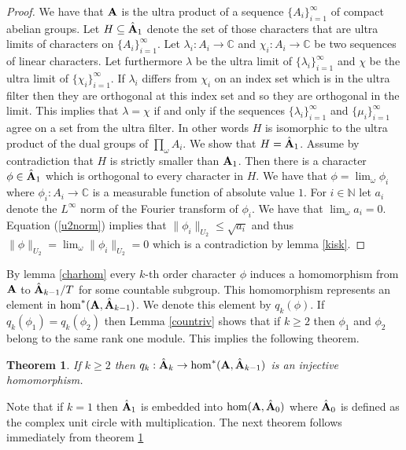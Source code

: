 \documentclass [11pt] {article}
\newtheorem{theorem}{Theorem}
\def\bA{{\bf A}}
\begin{document}
\begin{proof}
We have that $\bA$ is the ultra product of a sequence $\{A_i\}_{i=1}^\infty$ of compact abelian groups.
Let $H\subseteq\hat{\bA}_1$ denote the set of those characters that are ultra limits of characters on $\{A_i\}_{i=1}^\infty$.
Let $\lambda_i:A_i\rightarrow\mathbb{C}$ and $\chi_i:A_i\rightarrow\mathbb{C}$ be two sequences of linear characters. Let furthermore $\lambda$ be the ultra limit of $\{\lambda_i\}_{i=1}^\infty$ and $\chi$ be the ultra limit of $\{\chi_i\}_{i=1}^\infty$.
If $\lambda_i$ differs from $\chi_i$ on an index set which is in the ultra filter then they are orthogonal at this index set and so they are orthogonal in the limit. This implies that $\lambda=\chi$ if and only if the sequences $\{\lambda_i\}_{i=1}^\infty$ and $\{\mu_i\}_{i=1}^\infty$ agree on a set from the ultra filter. In other words $H$ is isomorphic to the ultra product of the dual groups of $\prod_\omega\hat{A_i}$. 
We show that $H=\hat{\bA}_1$. Assume by contradiction that $H$ is strictly smaller than $\bA_1$. Then there is a character $\phi\in\hat{\bA}_1$ which is orthogonal to every character in $H$.
We have that $\phi=\lim_\omega\phi_i$ where $\phi_i:A_i\rightarrow\mathbb{C}$ is a measurable function of absolute value $1$. For $i\in\mathbb{N}$ let $a_i$ denote the $L^\infty$ norm of the Fourier transform of $\phi_i$. 
We have that $\lim_\omega a_i=0$. Equation (\ref{u2norm}) implies that $\|\phi_i\|_{U_2}\leq \sqrt{a_i}$ and thus $\|\phi\|_{U_2}=\lim_\omega\|\phi_i\|_{U_2}=0$ which is a contradiction by lemma \ref{kisk}.
\end{proof}

\medskip

By lemma \ref{charhom} every $k$-th order character $\phi$ induces a homomorphism from $\bA$ to $\hat{\bA}_{k-1}/T$ for some countable subgroup. This homomorphism represents an element in $\hom^*(\bA,\hat{\bA}_{k-1})$. We denote this element by $q_k(\phi)$. If $q_k(\phi_1)=q_k(\phi_2)$ then Lemma \ref{countriv} shows that if $k\geq 2$ then $\phi_1$ and $\phi_2$ belong to the same rank one module.
This implies the following theorem.

\begin{theorem}\label{dualemb} If $k\geq 2$ then $q_k:\hat{\bA}_k\rightarrow\hom^*(\bA,\hat{\bA}_{k-1})$ is an injective homomorphism.
\end{theorem}

Note that if $k=1$ then $\hat{\bA}_1$ is embedded into $\hom(\bA,\hat{\bA}_0)$ where $\hat{\bA}_0$ is defined as the complex unit circle with multiplication.
The next theorem follows immediately from theorem \ref{dualemb}
\end{document}
